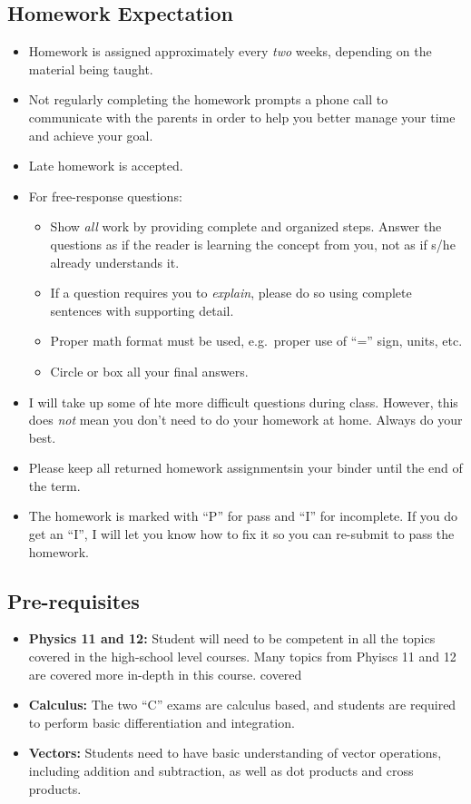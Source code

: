 \documentclass[11pt]{article}
\begin{document}
\subsection{Homework Expectation}

\begin{itemize}[itemsep=0pt,leftmargin=12pt]
\item Homework is assigned approximately every \emph{two} weeks, depending on
  the material being taught.
\item Not regularly completing the homework prompts a phone call to communicate
  with the parents in order to help you better manage your time and achieve
  your goal.
\item Late homework is accepted. 
\item For free-response questions:
  \begin{itemize}[noitemsep]
  \item Show \emph{all} work by providing complete and organized steps. Answer
    the questions as if the reader is learning the concept from you, not as if
    s/he already understands it.
  \item If a question requires you to \emph{explain}, please do so using
    complete sentences with supporting detail.
  \item Proper math format must be used, e.g.\ proper use of ``='' sign, units,
    etc.
  \item Circle or box all your final answers.
  \end{itemize}
\item I will take up some of hte more difficult questions during class.
  However, this does \emph{not} mean you don't need to do your homework at
  home. Always do your best.
\item Please keep all returned homework assignmentsin your binder until the end
  of the term.
\item The homework is marked with ``P'' for pass and ``I'' for incomplete. If
  you do get an ``I'', I will let you know how to fix it so you can re-submit
  to pass the homework. 
\end{itemize}


\subsection*{Pre-requisites}
  \begin{itemize}[itemsep=0pt,leftmargin=12pt]
  \item\textbf{Physics 11 and 12:} Student will need to be competent in all the
    topics covered in the high-school level courses. Many topics from Phyiscs
    11 and 12 are covered more in-depth in this course.
    covered
  \item\textbf{Calculus:} The two ``C'' exams are calculus based, and students
    are required to perform basic differentiation and integration.
  \item\textbf{Vectors:} Students need to have basic understanding of vector
    operations, including addition and subtraction, as well as dot products and
    cross products.
  \end{itemize}
\end{document}
